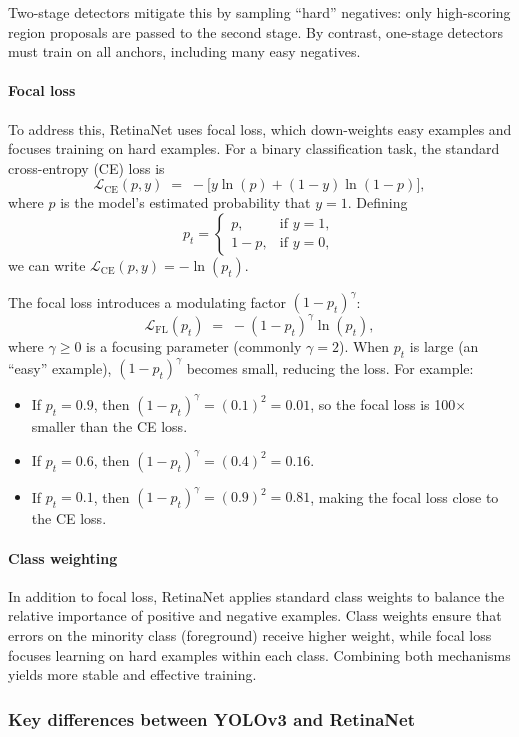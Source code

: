 Two-stage detectors mitigate this by sampling “hard” negatives: only high-scoring region proposals are passed to the second stage. By contrast, one-stage detectors must train on all anchors, including many easy negatives.

\paragraph{Focal loss}
To address this, RetinaNet uses focal loss, which down-weights easy examples and focuses training on hard examples. For a binary classification task, the standard cross-entropy (CE) loss is
\[
\mathcal{L}_{\text{CE}}(p, y) \;=\; -\bigl[y \ln(p) + (1 - y)\ln(1 - p)\bigr],
\]
where $p$ is the model's estimated probability that $y=1$. Defining 
\[
p_t = 
\begin{cases}
p, & \text{if } y = 1,\\
1 - p, & \text{if } y = 0,
\end{cases}
\]
we can write $\mathcal{L}_{\text{CE}}(p, y) = -\ln(p_t)$.

The focal loss introduces a modulating factor $(1 - p_t)^\gamma$:
\[
\mathcal{L}_{\text{FL}}(p_t) \;=\; -(1 - p_t)^\gamma \ln(p_t),
\]
where $\gamma \ge 0$ is a focusing parameter (commonly $\gamma=2$). When $p_t$ is large (an “easy” example), $(1 - p_t)^\gamma$ becomes small, reducing the loss. For example:
\begin{itemize}
  \item If $p_t = 0.9$, then $(1 - p_t)^\gamma = (0.1)^2 = 0.01$, so the focal loss is 100$\times $ smaller than the CE loss.
  \item If $p_t = 0.6$, then $(1 - p_t)^\gamma = (0.4)^2 = 0.16$.
  \item If $p_t = 0.1$, then $(1 - p_t)^\gamma = (0.9)^2 = 0.81$, making the focal loss close to the CE loss.
\end{itemize}

\paragraph{Class weighting}
In addition to focal loss, RetinaNet applies standard class weights to balance the relative importance of positive and negative examples. Class weights ensure that errors on the minority class (foreground) receive higher weight, while focal loss focuses learning on hard examples within each class. Combining both mechanisms yields more stable and effective training.

\subsubsection{Key differences between YOLOv3 and RetinaNet}

